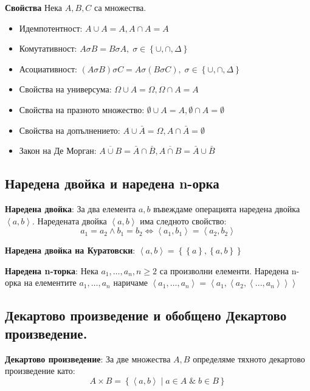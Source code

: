 \documentclass{article}
\renewcommand{\\}{\newline}
\newcommand{\amp}{\;\&\;}
\newcommand{\sep}{\;|\;}
\begin{document}
    \textbf{Свойства} Нека \(A, B, C\) са множества. 
      \begin{itemize}
          \item Идемпотентност: \(A \cup A = A, A \cap A = A\)  
          \item Комутативност: \(A \sigma B = B \sigma A,\; \sigma \in \left\{\cup, \cap, \Delta \right\}\)  
          \item Асоциативност: \((A \sigma B) \sigma C = A \sigma (B \sigma C),\; \sigma \in \left\{\cup, \cap, \Delta \right\}\)  
          \item Свойства на универсума: \(\Omega \cup A = \Omega, \Omega \cap A = A\)
          \item Свойства на празното множество: \(\emptyset \cup A = A, \emptyset \cap A = \emptyset\)  
          \item Свойства на допълнението: \(A \cup \bar{A} = \Omega, A \cap \bar{A} = \emptyset\)  
          \item Закон на Де Морган: \(\overline{A \cup B} = \bar{A} \cap \bar{B}, \overline{A \cap B} = \bar{A} \cup \bar{B}\)  
      \end{itemize}

      \subsection{Наредена двойка и наредена n-орка }
    \textbf{Наредена двойка}: За два елемента \(a, b\) въвеждаме операцията наредена двойка \(\left\langle a, b \right\rangle\). Наредената двойка \(\left\langle a, b \right\rangle\) има следното свойство: 
    \[
      a_{1}=a_{2}\land b_{1}=b_{2} \iff \left\langle a_1, b_1 \right\rangle = \left\langle a_2, b_2 \right\rangle
    \] 

    \textbf{Наредена двойка на Куратовски}: \(\left\langle a, b \right\rangle = \left\{\left\{ a \right\}, \left\{ a, b \right\} \right\}\)  

    \textbf{Наредена n-торка}: Нека \(a_1, \dots, a_n, n\geq2\) са произволни елементи. Наредена n-орка на елементите \(a_1,\dots, a_n\) наричаме \(\left\langle a_1,\dots, a_n \right\rangle = \left\langle a_1, \left\langle a_2, \left\langle ..., a_n \right\rangle \right\rangle \right\rangle\)    
    
    \subsection{Декартово произведение и обобщено Декартово произведение. }
    \textbf{Декартово произведение}: За две множества \(A, B\) определяме тяхното декартово произведение като: \[
      A \times B = \left\{ \left\langle a, b \right\rangle \sep a \in A \amp b \in B \right\}
    \]    
\end{document}
